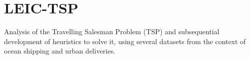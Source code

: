 \chapter{LEIC-\/\+TSP}
\hypertarget{md__r_e_a_d_m_e}{}\label{md__r_e_a_d_m_e}
\label{md__r_e_a_d_m_e_autotoc_md0}%
%
 Analysis of the Travelling Salesman Problem (TSP) and subsequential development of heuristics to solve it, using several datasets from the context of ocean shipping and urban deliveries. 